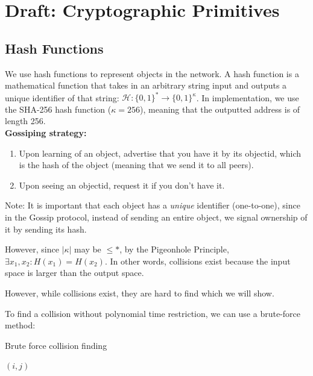 \chapter{Draft: Cryptographic Primitives}

\section{Hash Functions}
\quad We use hash functions to represent objects in the network. A hash function is a mathematical function that takes in an arbitrary string input and outputs a unique identifier of that string: $\mathcal{H}: \{0,1\}^* \rightarrow \{0,1\}^\kappa$.
In implementation, we use the SHA-256 hash function ($\kappa = 256$), meaning that the outputted address is of length 256. \\

\textbf{Gossiping strategy: }
\begin{enumerate}
    \item Upon learning of an object, advertise that you have it by its objectid, which is the hash of the object (meaning that we send it to all peers).
    \item Upon seeing an objectid, request it if you don't have it.
\end{enumerate}
Note: It is important that each object has a \textit{unique} identifier (one-to-one), since in the Gossip protocol, instead of sending an entire object, we signal ownership of it by sending its hash.\newline

However, since $|\kappa|$ may be $\leq *$, by the Pigeonhole Principle, $\exists x_1, x_2: H(x_1)=H(x_2)$. In other words, collisions exist because the input space is larger than the output space.

However, while collisions exist, they are hard to find which we will show.

To find a collision without polynomial time restriction, we can use a brute-force method: \\
\begin{algorithm}
\caption{Brute force collision finding}
\label{a'2}
\begin{algorithmic}[1]
        \State \Return $(i,j)$
    \EndIf
    \EndFor
    \EndFor
\EndFunction
\end{algorithmic}
\end{algorithm}


